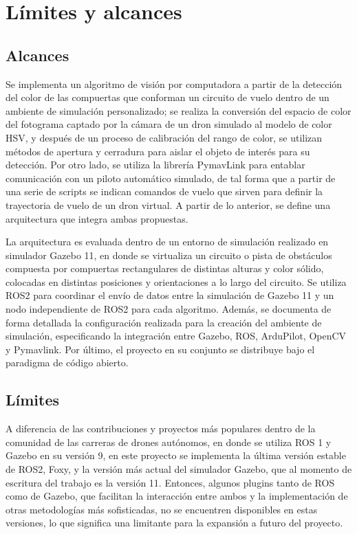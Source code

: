 \section{Límites y alcances}

\subsection{Alcances}
Se implementa un algoritmo de visión por computadora a partir de la detección del color de las compuertas que conforman un circuito de vuelo dentro de un ambiente de simulación personalizado; se realiza la conversión del espacio de color del fotograma captado por la cámara de un dron simulado al modelo de color HSV, y después de un proceso de calibración del rango de color, se utilizan métodos de apertura y cerradura para aislar el objeto de interés para su detección. Por otro lado, se utiliza la librería PymavLink para entablar comunicación con un piloto automático simulado, de tal forma que a partir de una serie de scripts se indican comandos de vuelo que sirven para definir la trayectoria de vuelo de un dron virtual. A partir de lo anterior, se define una arquitectura que integra ambas propuestas.  

La arquitectura es evaluada dentro de un entorno de simulación realizado en simulador Gazebo 11, en donde se virtualiza un circuito o pista de obstáculos compuesta por compuertas rectangulares de distintas alturas y color sólido, colocadas en distintas posiciones y orientaciones a lo largo del circuito. Se utiliza ROS2 para coordinar el envío de datos entre la simulación de Gazebo 11 y un nodo independiente de ROS2 para cada algoritmo. Además, se documenta de forma detallada la configuración realizada para la creación del ambiente de simulación, especificando la integración entre Gazebo, ROS, ArduPilot, OpenCV y Pymavlink. Por último, el proyecto en su conjunto se distribuye bajo el paradigma de código abierto.

\subsection{Límites}
A diferencia de las contribuciones y proyectos más populares dentro de la comunidad de las carreras de drones autónomos, en donde se utiliza ROS 1 y Gazebo en su versión 9, en este proyecto se implementa la última versión estable de ROS2, Foxy, y la versión más actual del simulador Gazebo, que al momento de escritura del trabajo es la versión 11. Entonces, algunos plugins tanto de ROS como de Gazebo, que facilitan la interacción entre ambos y la implementación de otras metodologías más sofisticadas, no se encuentren disponibles en estas versiones, lo que significa una limitante para la expansión a futuro del proyecto. 

